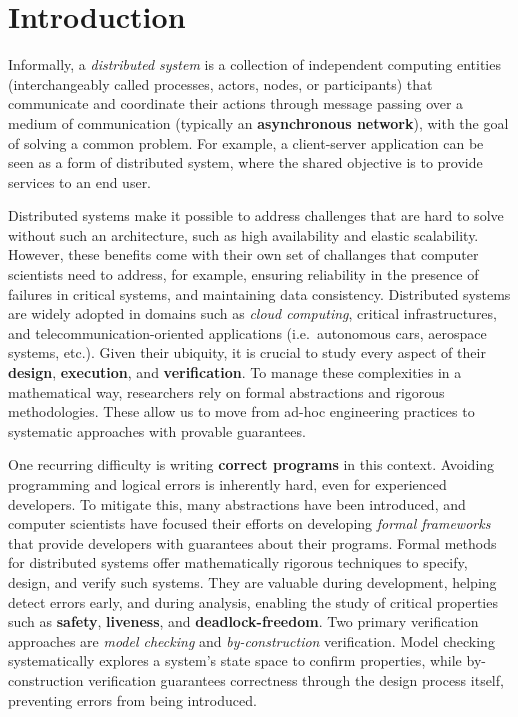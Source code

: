 \chapter{Introduction} \label{chap:intro}
\pagestyle{plain}
\setcounter{page}{1}

Informally, a \textit{distributed system} is a collection of independent 
computing entities (interchangeably called processes, actors, 
nodes, or participants) that communicate and coordinate their 
actions through message passing over a medium of communication 
(typically an \textbf{asynchronous network}), with the goal of solving a 
common problem. For example, a client-server application can be seen 
as a form of distributed system, where the shared objective is to provide 
services to an end user.

Distributed systems make it possible to address challenges that are
hard to solve without such an architecture, such as high availability
and elastic scalability. However, these benefits come with their own
set of challanges that computer scientists need to
address, for example, ensuring reliability in the presence of failures
in critical systems, and maintaining data consistency.
Distributed systems are 
widely adopted in domains such as \textit{cloud computing}, critical 
infrastructures, and telecommunication-oriented applications (i.e.\ 
autonomous cars, aerospace systems, etc.). Given their ubiquity, it is 
crucial to study every aspect of their \textbf{design}, \textbf{execution}, 
and \textbf{verification}.
To manage these complexities in a mathematical way, researchers rely on
formal abstractions and rigorous methodologies. These allow us to move
from ad-hoc engineering practices to systematic approaches with
provable guarantees.

One recurring difficulty is writing \textbf{correct programs} in this 
context. Avoiding programming and logical errors is inherently hard, even 
for experienced developers. To mitigate this, many abstractions have been 
introduced, and computer scientists have focused their efforts on developing 
\textit{formal frameworks} that provide developers with guarantees about 
their programs. Formal methods for distributed systems offer 
mathematically rigorous techniques to specify, design, and 
verify such systems.
They are valuable during development, helping 
detect errors early, and during analysis, enabling the study of critical 
properties such as \textbf{safety}, \textbf{liveness}, and 
\textbf{deadlock-freedom}. Two primary verification approaches are 
\textit{model checking} and \textit{by-construction} verification. Model 
checking systematically explores a system's state space to confirm 
properties, while by-construction verification guarantees correctness 
through the design process itself, preventing errors from being introduced. 

